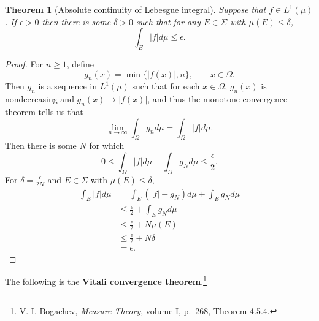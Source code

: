 \documentclass{article}
\newtheorem{theorem}{Theorem}
\theoremstyle{definition}
\begin{document}
\begin{theorem}[Absolute continuity of Lebesgue integral]
Suppose that $f \in L^1(\mu)$. If $\epsilon>0$ then there is some $\delta>0$ such that for any
$E \in \Sigma$ with $\mu(E) \leq \delta$,
\[
\int_E |f| d\mu \leq \epsilon.
\]
\label{absolutecontinuity}
\end{theorem}
\begin{proof}
For $n \geq 1$, define
\[
g_n(x) = \min\{|f(x)|,n\}, \qquad x \in \Omega.
\]
Then $g_n$ is a sequence in $L^1(\mu)$ such that for each $x \in \Omega$,
$g_n(x)$ is nondecreasing and $g_n(x) \to |f(x)|$, and thus the monotone convergence theorem
tells us that 
\[
\lim_{n \to \infty} \int_\Omega g_n d\mu = \int_\Omega |f| d\mu.
\]
Then there is some $N$ for which
\[
0 \leq \int_\Omega |f| d\mu - \int_\Omega g_N d\mu \leq \frac{\epsilon}{2}.
\]
For $\delta=\frac{\epsilon}{2N}$ and $E \in \Sigma$ with $\mu(E) \leq \delta$,
\begin{align*}
\int_E |f| d\mu&=\int_E (|f|-g_N) d\mu + \int_E g_N d\mu\\
&\leq \frac{\epsilon}{2}+\int_E g_N d\mu\\
&\leq \frac{\epsilon}{2}+N \mu(E)\\
&\leq \frac{\epsilon}{2}+N\delta\\
&=\epsilon.
\end{align*}
\end{proof}


The following is the \textbf{Vitali convergence theorem}.\footnote{V. I. Bogachev, {\em Measure Theory}, volume I,
p.~268, Theorem 4.5.4.}
\end{document}
